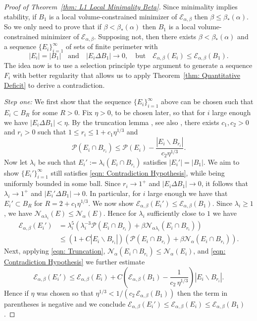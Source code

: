 \documentclass[a4paper,11pt,reqno]{amsart}
\numberwithin{equation}{section}
\theoremstyle{remark}
\theoremstyle{definition}
\renewcommand{\setminus}{\backslash}
\newcommand{\ene}{\mathcal{E}_{\alpha,\beta}}
\newcommand{\nl}{\mathcal{N}_{\alpha}}
\renewcommand{\leq}{\leqslant}
\renewcommand{\geq}{\geqslant}
\newcommand{\calN}{\mathcal{N}}
\newcommand{\Pe}{\mathcal{P}}
\begin{document}
\begin{proof}[Proof of Theorem~\ref{thm: L1 Local Minimality Beta}] Since minimality implies stability, if $B_1$ is a local volume-constrained minimizer of $\ene$ then $\beta \leq \beta_*(\alpha)$. So we only need to prove that if $\beta < \beta_*(\alpha)$ then $B_1$ is a local volume-constrained minimizer of $\ene$. Supposing not, then there exists $\beta<\beta_*(\alpha)$ and a sequence $\{E_i\}_{i=1}^{\infty}$ of sets of finite perimeter with 
	\begin{equation}\label{eqn: Contradiction Hypothesis}
	|E_i|=|B_1| \quad \text{and} \quad |E_i\Delta B_1|\to 0, \quad \text{but} \quad \ene(E_i)\leq \ene(B_1).
	\end{equation}
The idea now is to use a selection principle type argument to generate a sequence $F_i$ with better regularity that allows us to apply Theorem~\ref{thm: Quantitative Deficit} to derive a contradiction.

\textit{Step one:} We first show that the sequence $\{E_i\}_{i=1}^{\infty}$ above can be chosen such that $E_i\subset B_R$ for some $R>0$. Fix $\eta>0$, to be chosen later, so that for $i$ large enough we have $|E_i\Delta B_1|<\eta$. By the truncation lemma \cite[VI. 14]{Almgren}, see also \cite[Lemma 29.12]{Mag}, there exists $c_1,c_2>0$ and $r_i>0$ such that $1\leq r_i \leq 1+c_1\eta^{1/3}$ and
	\begin{equation}\label{eqn: Truncation}
		\Pe(E_i\cap B_{r_i}) \leq \Pe(E_i) - \frac{|E_i\setminus B_{r_i}|}{c_2\eta^{1/3}}.
	\end{equation}
\indent Now let $\lambda_i$ be such that $E_i':=\lambda_i(E_i\cap B_{r_i})$ satisfies $|E_i'|=|B_1|$. We aim to show $\{E_i'\}_{i=1}^{\infty}$ still satisfies \eqref{eqn: Contradiction Hypothesis}, while being uniformly bounded in some ball. Since $r_i\to 1^+$ and $|E_i\Delta B_1|\to 0$, it follows that $\lambda_i\to 1^+$ and $|E_i'\Delta B_1|\to 0$. In particular, for $i$ large enough we have that $E_i'\subset B_R$ for $R = 2+c_1\eta^{1/3}$. We now show $\ene(E_i') \leq \ene(B_1)$. Since $\lambda_i \geq 1$, we have $\calN_{\alpha \lambda_i}(E)\leq \nl(E)$. Hence for $\lambda_i$ sufficiently close to $1$ we have
	\begin{align*}
		\ene(E_i') &= \lambda_i^5\left(\lambda_i^{-3}\Pe(E_i\cap B_{r_i})+\beta \calN_{\alpha \lambda_i}(E_i\cap B_{r_i})\right)\\
		&\leq (1+C|E_i \setminus B_{r_i}|)\left(\Pe(E_i \cap B_{r_i}) + \beta \nl(E_i \cap B_{r_i})\right).
	\end{align*}
Next, applying \eqref{eqn: Truncation}, $\nl(E_i\cap B_{r_i})\leq \nl(E_i)$, and \eqref{eqn: Contradiction Hypothesis} we further estimate
	\[
		\ene(E_i') \leq \ene(E_i)+C\left(\ene(B_1) - \frac{1}{c_2\,\eta^{1/3}} \right)|E_i \setminus B_{r_i}|.
	\]
Hence if $\eta$ was chosen so that $\eta^{1/3}<1/(c_2\,\ene(B_1))$ then the term in parentheses is negative and we conclude $\ene(E_i')\leq \ene(E_i)\leq \ene(B_1)$.


\end{proof}
\end{document}
